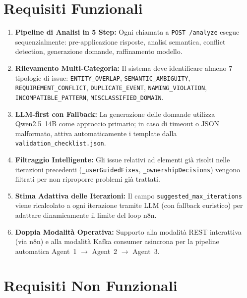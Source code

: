 \documentclass[12pt,a4paper]{report}
\begin{document}
\section{Requisiti Funzionali}

\begin{enumerate}
  \item \textbf{Pipeline di Analisi in 5 Step:} Ogni chiamata a \texttt{POST /analyze}
        esegue sequenzialmente: pre-applicazione risposte, analisi semantica,
        conflict detection, generazione domande, raffinamento modello.

  \item \textbf{Rilevamento Multi-Categoria:} Il sistema deve identificare almeno
        7 tipologie di issue: \texttt{ENTITY\_OVERLAP}, \texttt{SEMANTIC\_AMBIGUITY},
        \texttt{REQUIREMENT\_CONFLICT}, \texttt{DUPLICATE\_EVENT},
        \texttt{NAMING\_VIOLATION}, \texttt{INCOMPATIBLE\_PATTERN},
        \texttt{MISCLASSIFIED\_DOMAIN}.

  \item \textbf{LLM-first con Fallback:} La generazione delle domande utilizza
        Qwen2.5~14B come approccio primario; in caso di timeout o JSON malformato,
        attiva automaticamente i template dalla \texttt{validation\_checklist.json}.

  \item \textbf{Filtraggio Intelligente:} Gli issue relativi ad elementi già risolti
        nelle iterazioni precedenti (\texttt{\_userGuidedFixes},
        \texttt{\_ownershipDecisions}) vengono filtrati per non riproporre
        problemi già trattati.

  \item \textbf{Stima Adattiva delle Iterazioni:} Il campo
        \texttt{suggested\_max\_iterations} viene ricalcolato a ogni iterazione
        tramite LLM (con fallback euristico) per adattare dinamicamente il limite
        del loop n8n.

  \item \textbf{Doppia Modalità Operativa:} Supporto alla modalità REST interattiva
        (via n8n) e alla modalità Kafka consumer asincrona per la pipeline automatica
        Agent~1 $\rightarrow$ Agent~2 $\rightarrow$ Agent~3.
\end{enumerate}

\section{Requisiti Non Funzionali}
\end{document}
